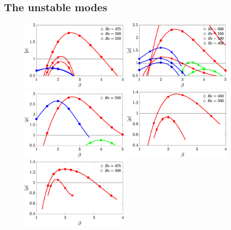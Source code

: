 \subsection{The unstable modes}

\begin{figure}
  \centering
  \includegraphics[width=0.49\textwidth]{./fig/AR5s/multipliers_AR5p25.eps}  
  \includegraphics[width=0.49\textwidth]{./fig/AR5s/multipliers_AR5p5.eps}  
  \includegraphics[width=0.49\textwidth]{./fig/AR5s/multipliers_AR5p75.eps} 
  \includegraphics[width=0.49\textwidth]{./fig/AR7s/multipliers_AR6.eps}  
  \includegraphics[width=0.49\textwidth]{./fig/AR7s/multipliers_AR7.eps}

\end{figure}
